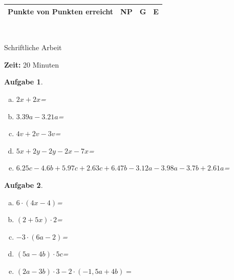 \documentclass[12pt,fleqn]{article}
\theoremstyle{aufg}
\newtheorem{aufgabe}{Aufgabe}
\theoremstyle{bsp}
\begin{document}
 
    \begin{flushleft}
\renewcommand{\arraystretch}{2.15} 
\begin{tabular}{|p{10cm}|p{2cm}|p{2cm}|p{2cm}|} 
\hline 
\hspace{2cm} Punkte von \qquad20\qquad Punkten erreicht & \hspace{1.2cm} NP & G & E \\ 
\hline 
\end{tabular} \\[1em]    
\begin{center}{\Large Schriftliche Arbeit}\end{center} 
{\bf Zeit: }20 Minuten\\ 
\begin{aufgabe} ~ \\ 
\begin{enumerate}[a)] 
\item 
$2x+2x$=
\item 
$3.39a-3.21a$=
\item 
$4v+2v-3v$=
\item 
$5x+2y-2y-2x-7x$=
\item 
$6.25c-4.6b+5.97c+2.63c+6.47b-3.12a-3.98a-3.7b+2.61a$=
\end{enumerate} 
\end{aufgabe} 
\begin{aufgabe} ~ \\ 
\begin{enumerate}[a)] 
\item 
$6\cdot(4x-4)$=
\item 
$(2+5x)\cdot2$=
\item 
$-3\cdot(6a-2)$=
\item 
$(5a-4b)\cdot5c$=
\item 
$(2a-3b)\cdot 3-2\cdot (-1,5a+4b)=$
\end{enumerate} 
\end{aufgabe} 
\end{flushleft} 
    
\end{document}
